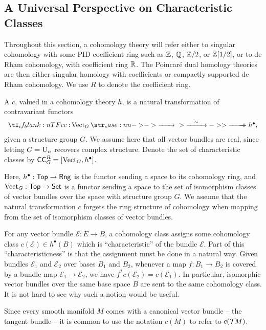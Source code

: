 \subsection{A Universal Perspective on Characteristic Classes}\label{sec:axiomatic-characteristic-classes}

Throughout this section, a cohomology theory will refer either to singular cohomology with some PID coefficient ring such as $\mathbb{Z}$, $\mathbb{Q}$, $\mathbb{Z}/2$, or $\mathbb{Z}[1/2]$, or to de Rham cohomology, with coefficient ring $\mathbb{R}$. The Poincar\'e dual homology theories are then either singular homology with coefficients or compactly supported de Rham cohomology. We use $R$ to denote the coefficient ring.

\begin{definition}\label{defn:characteristic-class}
	A  $c$, valued in a cohomology theory $h$, is a natural transformation of contravariant functors
	\[
		\lkxfunc{c}{\Vect_G}{h^\bullet,}
	\]
	given a structure group $G$. We assume here that all vector bundles are real, since letting $G=\mathrm{U}_n$ recovers complex structure. Denote the set of characteristic classes by $\mathsf{CC}_G^R = [\operatorname{Vect}_G , h^\bullet]$.
\end{definition}

Here, $h^\bullet : \mathsf{Top} \to \mathsf{Rng}$ is the functor sending a space to its  cohomology ring, and $\operatorname{Vect}_G : \mathsf{Top} \to \mathsf{Set}$ is a functor sending a space to the set of isomorphism classes of vector bundles over the space with structure group $G$. We assume that the natural transformation $c$ forgets the ring structure of cohomology when mapping from the set of isomorphism classes of vector bundles.

For any vector bundle $\mathcal{E} : E \to B$, a cohomology class assigns some cohomology class $c(\mathcal{E})\in h^\bullet(B)$ which is ``characteristic'' of the bundle $\mathcal{E}$.
Part of this ``characteristicness'' is that the assignment must be done in a natural way. Given bundles $\mathcal{E}_1$ and $\mathcal{E}_2$ over bases $B_1$ and $B_2$, whenever a map $f : B_1 \to B_2$ is covered by a bundle map $\mathcal{E}_1 \to \mathcal{E}_2$, we have $f^* c(\mathcal{E}_2) = c(\mathcal{E}_1)$. In particular, isomorphic vector bundles over the same base space $B$ are sent to the same cohomology class. It is not hard to see why such a notion would be useful.

\begin{convention*}
	Since every smooth manifold $M$ comes with a canonical vector bundle -- the tangent bundle -- it is common to use the notation $c(M)$ to refer to $c({\mathcal{T}\hspace{-0.1em}} M)$.
\end{convention*}

